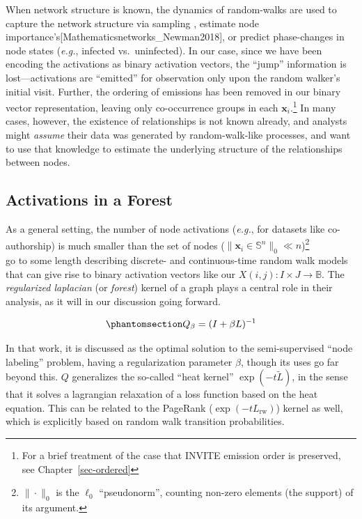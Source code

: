 \documentclass[%
	12pt,
		oneside,
		letterpaper
]{book}
\begin{document}
When network structure is known, the dynamics of random-walks are used to capture the network structure via sampling \autocite{LittleBallFur_Rozemberczki2020}, estimate node importance's{[}Mathematicsnetworks\_Newman2018{]}, or predict phase-changes in node states (\emph{e.g.}, infected vs.~uninfected)\autocite{StructureFunctionComplex_Newman2003}.
In our case, since we have been encoding the activations as binary activation vectors, the ``jump'' information is lost---activations are ``emitted'' for observation only upon the random walker's initial visit.\autocite{Humanmemorysearch_Jun2015}
Further, the ordering of emissions has been removed in our binary vector representation, leaving only co-occurrence groups in each \(\mathbf{x}_i\).\footnote{For a brief treatment of the case that INVITE emission order is preserved, see Chapter~\ref{sec-ordered}}
In many cases, however, the existence of relationships is not known already, and analysts might \emph{assume} their data was generated by random-walk-like processes, and want to use that knowledge to estimate the underlying structure of the relationships between nodes.

\subsection{Activations in a Forest}\label{activations-in-a-forest}

As a general setting, the number of node activations (\emph{e.g.}, for datasets like co-authorship) is much smaller than the set of nodes (\(\|\mathbf{x}_i\in\mathbb{S}^n\|_0 \ll n\))\footnote{
  \(\|\cdot\|_0\) is the \(\ell_0\) ``pseudonorm'', counting non-zero elements (the support) of its argument.}\\
\textcite{Semisupervisedlearning_Avrachenkov2017} go to some length describing discrete- and continuous-time random walk models that can give rise to binary activation vectors like our \(X(i,j):I\times J\rightarrow \mathbb{B}\).
The \emph{regularized laplacian} (or \emph{forest}) kernel of a graph\autocite{SimilaritiesgraphsKernels_Avrachenkov2019} plays a central role in their analysis, as it will in our discussion going forward.

\begin{equation}\phantomsection\label{eq-regulap}{
Q_{\beta} = (I+\beta L)^{-1}
}\end{equation}

In that work, it is discussed as the optimal solution to the semi-supervised ``node labeling'' problem, having a regularization parameter \(\beta\), though its uses go far beyond this.\autocite{GraphLaplacianRegularization_Pang2017,Countingrootedforests_Knill2013,MatrixForestTheorem_Chebotarev2006}
\(Q\) generalizes the so-called ``heat kernel'' \(\exp{(-t\tilde{L})}\), in the sense that it solves a lagrangian relaxation of a loss function based on the heat equation.
This can be related to the PageRank (\(\exp{(-tL_{\text{rw}})}\)) kernel as well, which is explicitly based on random walk transition probabilities.
\end{document}
